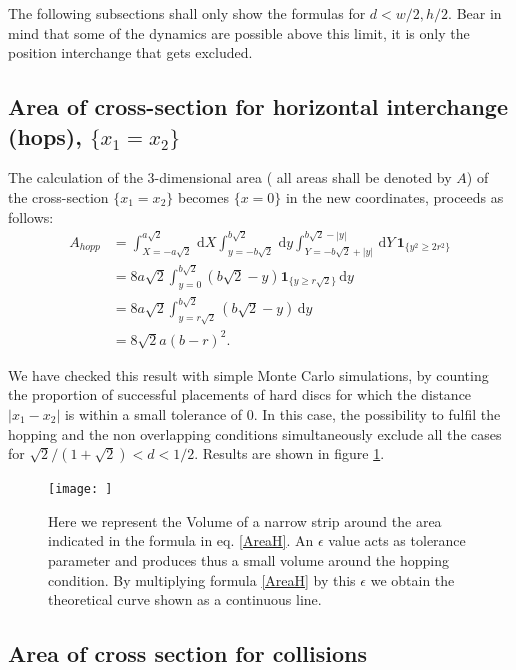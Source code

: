 \documentclass[a4paper,10pt, jcp, aps, preprint]{revtex4-1}
\newcommand{\rd}{\, \mathrm{d}}
\newcommand{\indicator}[1]{\mathbf{1}_{ \{   #1 \} } }
\begin{document}
The following subsections shall only show the formulas for $d<w/2, h/2$.
Bear in mind that some of the dynamics are possible above this limit,
it is only the position interchange that gets excluded. 

\subsection{Area of cross-section for horizontal interchange (hops), 
$\{x_1 = x_2\}$}

The calculation of the $3$-dimensional area  ( all areas shall be 
denoted by $A$)
of the cross-section 
$\{x_1 = x_2\}$ becomes 
$\{ x=0 \}$ in the new coordinates, proceeds as follows:
\begin{align}
 A_{hopp} &= \int_{X=-a \sqrt{2} }^{a \sqrt{2}}  \rd X
 \int_{y=-b \sqrt{2}}^{b \sqrt{2}} \rd y
\int_{Y=-b \sqrt{2} + |y| }^{b \sqrt{2}-|y|}  \rd Y
\, \indicator{y^2 \ge 2r^2 } \\
&= 8 a \sqrt{2} \int_{y=0}^{b \sqrt{2}} 
\left( b \sqrt{2} - y \right)  \indicator{y \ge r \sqrt{2} }  \rd y \\
&= 8 a \sqrt{2} \int_{y= r\sqrt{2}}^{b \sqrt{2}}  \left( b \sqrt{2} - y \right)  \rd y \\
&= 8 \sqrt{2} a ( b - r )^2. \label{AreaH}
\end{align}

We have checked this result with simple Monte Carlo simulations, 
by counting the proportion of successful placements of hard discs 
for which the distance 
$|x_1 - x_2|$ is within a small tolerance of $0$. 
In this case, the possibility to fulfil
the hopping and the non overlapping conditions simultaneously exclude 
all the cases for $\sqrt{2}/(1+\sqrt{2}) <d<1/2$. 
Results are shown in figure \ref{AreaHopp01}.

\begin{figure}[h]
\centering
\texttt{[image: ]}
\caption{Here we represent the Volume of a narrow strip around the area
  indicated in the formula in eq. \ref{AreaH}. An $\epsilon$ value acts as
tolerance parameter and produces thus a small volume around the 
hopping condition. By multiplying formula \ref{AreaH} by this $\epsilon$
we obtain the theoretical curve shown as a continuous line.} 
\label{AreaHopp01}
\end{figure}


\subsection{Area of cross section for collisions}
\end{document}
